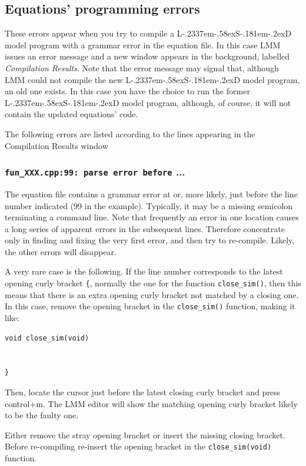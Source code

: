 \documentclass [11pt,a4paper] {book}
\def\LsD{{L\kern-.2337em\lower-.58ex\hbox{S}\kern-.181em\lower-.2ex\hbox{D}}\xspace}
\begin{document}
\subsection{Equations' programming errors} \label{sec:progr_err}

These errors appear when you try to compile a \LsD model program with a grammar error in
the equation file. In this case LMM issues an error message and a new window appears in
the background, labelled \textit{Compilation Results}. Note that the error message may
signal that, although LMM could not compile the new \LsD model program, an old one exists.
In this case you have the choice to run the former \LsD model program, although, of
course, it will not contain the updated equations' code.

The following errors are listed according to the lines appearing in the Compilation
Results window

\subsubsection{\texttt{fun\_XXX.cpp:99: parse error before} ... }

The equation file contains a grammar error at or, more likely, just before the line
number indicated (99 in the example). Typically, it may be a missing semicolon
terminating a command line. Note that frequently an error in one location causes a long
series of apparent errors in the subsequent lines. Therefore concentrate only in finding
and fixing the very first error, and then try to re-compile. Likely, the other errors
will disappear.

A very rare case is the following. If the line number corresponds to the latest opening
curly bracket \texttt{\{}, normally the one for the function \texttt{close\_sim()}, then
this means that there is an extra opening curly bracket not matched by a closing one. In
this case, remove the opening bracket in the \texttt{close\_sim()} function, making it
like:

\begin{verbatim}
void close_sim(void)


}
\end{verbatim}
Then, locate the cursor just before the latest closing curly bracket and press control+m.
The LMM editor will show the matching opening curly bracket likely to be the faulty one.

Either remove the stray opening bracket or insert the missing closing bracket. Before
re-compiling re-insert the opening bracket in the \texttt{close\_sim(void)} function.
\end{document}
